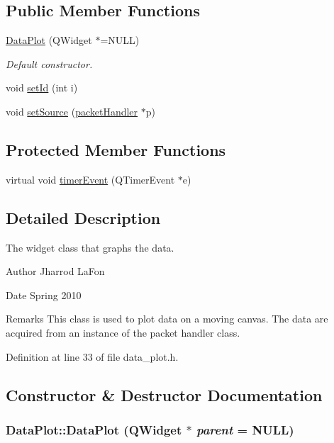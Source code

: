 \subsection*{Public Member Functions}
\begin{DoxyCompactItemize}
\item 
\hyperlink{classDataPlot_a1343acbd6095212532c4315d6e9f1711}{DataPlot} (QWidget $\ast$=NULL)
\begin{DoxyCompactList}\small\item\em Default constructor. \item\end{DoxyCompactList}\item 
void \hyperlink{classDataPlot_ab6af06dfac3585a7dc669ea333a0869d}{setId} (int i)
\item 
void \hyperlink{classDataPlot_aace03b9e68e11042c0fade588e2869a7}{setSource} (\hyperlink{classpacketHandler}{packetHandler} $\ast$p)
\end{DoxyCompactItemize}
\subsection*{Protected Member Functions}
\begin{DoxyCompactItemize}
\item 
virtual void \hyperlink{classDataPlot_a41c9c4bc12d8d3e3abdf893c4fcfad7b}{timerEvent} (QTimerEvent $\ast$e)
\end{DoxyCompactItemize}


\subsection{Detailed Description}
The widget class that graphs the data. \begin{DoxyAuthor}{Author}
Jharrod LaFon 
\end{DoxyAuthor}
\begin{DoxyDate}{Date}
Spring 2010 
\end{DoxyDate}
\begin{DoxyRemark}{Remarks}
This class is used to plot data on a moving canvas. The data are acquired from an instance of the packet handler class. 
\end{DoxyRemark}


Definition at line 33 of file data\_\-plot.h.



\subsection{Constructor \& Destructor Documentation}
\hypertarget{classDataPlot_a1343acbd6095212532c4315d6e9f1711}{
\subsubsection[{DataPlot}]{\setlength{\rightskip}{0pt plus 5cm}DataPlot::DataPlot (QWidget $\ast$ {\em parent} = {\ttfamily NULL})}}
\label{classDataPlot_a1343acbd6095212532c4315d6e9f1711}


